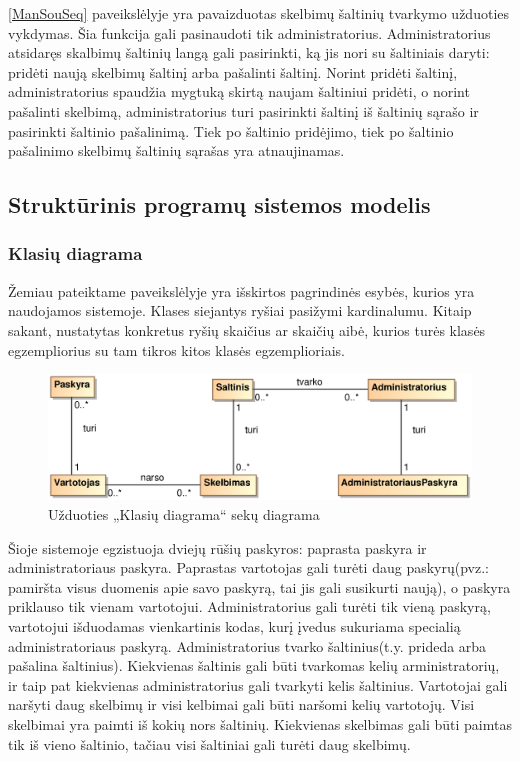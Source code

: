 \documentclass[12pt]{article}
\begin{document}
	\ref{ManSouSeq} paveikslėlyje yra pavaizduotas skelbimų šaltinių tvarkymo užduoties vykdymas. Šia funkcija gali pasinaudoti tik administratorius. Administratorius atsidaręs skalbimų šaltinių langą gali pasirinkti, ką jis nori su šaltiniais daryti: pridėti naują skelbimų šaltinį arba pašalinti šaltinį. Norint pridėti šaltinį, administratorius spaudžia mygtuką skirtą naujam šaltiniui pridėti, o norint pašalinti skelbimą, administratorius turi pasirinkti šaltinį iš šaltinių sąrašo ir pasirinkti šaltinio pašalinimą. Tiek po šaltinio pridėjimo, tiek po šaltinio pašalinimo skelbimų šaltinių sąrašas yra atnaujinamas.
	\pagebreak
	
	\subsection{Struktūrinis programų sistemos modelis}
	\subsubsection{Klasių diagrama}
	
	Žemiau pateiktame paveikslėlyje yra išskirtos pagrindinės esybės, kurios yra naudojamos sistemoje. Klases siejantys ryšiai pasižymi kardinalumu. Kitaip sakant, nustatytas konkretus ryšių skaičius ar skaičių aibė, kurios turės klasės egzempliorius su tam tikros kitos klasės egzemplioriais.
	
	\begin{figure}[h]
		\begin{center}
			\includegraphics[width=\textwidth]{KlasiuDiagrama.eps}
			\caption{Užduoties „Klasių diagrama“ sekų diagrama\label{ClassDiagram}}
		\end{center}
	\end{figure}
	
	Šioje sistemoje egzistuoja dviejų rūšių paskyros: paprasta paskyra ir administratoriaus paskyra. Paprastas vartotojas gali turėti daug paskyrų(pvz.: pamiršta visus duomenis apie savo paskyrą, tai jis gali susikurti naują), o paskyra priklauso tik vienam vartotojui. Administratorius gali turėti tik vieną paskyrą, vartotojui išduodamas vienkartinis kodas, kurį įvedus sukuriama specialią administratoriaus paskyrą. Administratorius tvarko šaltinius(t.y. prideda arba pašalina šaltinius). Kiekvienas šaltinis gali būti tvarkomas kelių arministratorių, ir taip pat kiekvienas administratorius gali tvarkyti kelis šaltinius. Vartotojai gali naršyti daug skelbimų ir visi kelbimai gali būti naršomi kelių vartotojų. Visi skelbimai yra paimti iš kokių nors šaltinių. Kiekvienas skelbimas gali būti paimtas tik iš vieno šaltinio, tačiau visi šaltiniai gali turėti daug skelbimų.
	\pagebreak
	
\end{document}
